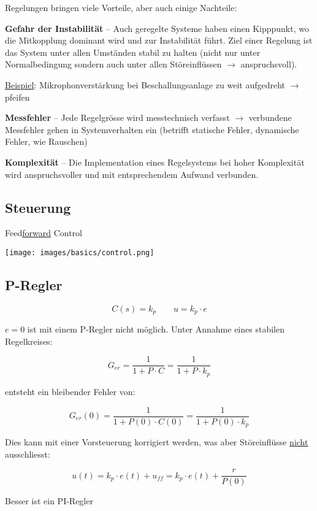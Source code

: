 \documentclass[
  10pt,
  a4paper,
  twocolumn]{article}
\numberwithin{equation}{section}
\begin{document}
Regelungen bringen viele Vorteile, aber auch einige Nachteile:

\textbf{Gefahr der Instabilität} -- Auch geregelte Systeme haben einen
Kipppunkt, wo die Mitkopplung dominant wird und zur Instabilität führt.
Ziel einer Regelung ist das System unter allen Umständen stabil zu
halten (nicht nur unter Normalbedingung sondern auch unter allen
Störeinflüssen \(\rightarrow\) anspruchsvoll).

\ul{Beispiel}: Mikrophonverstärkung bei Beschallungsanlage zu weit
aufgedreht \(\rightarrow\) pfeifen

\textbf{Messfehler} -- Jede Regelgrösse wird messtechnisch verfasst
\(\rightarrow\) verbundene Messfehler gehen in Systemverhalten ein
(betrifft statische Fehler, dynamische Fehler, wie Rauschen)

\textbf{Komplexität} -- Die Implementation eines Regelsystems bei hoher
Komplexität wird anspruchsvoller und mit entsprechendem Aufwand
verbunden.

\subsection{Steuerung}\label{steuerung}

Feed\ul{forward} Control

\texttt{[image: images/basics/control.png]}

\subsection{P-Regler}\label{p-regler}

\[
C(s) = k_p \qquad u = k_p\cdot e
\]

\begin{tcolorbox}[enhanced jigsaw, coltitle=black, colback=white, breakable, colframe=quarto-callout-warning-color-frame, rightrule=.15mm, left=2mm, opacityback=0, leftrule=.75mm, toptitle=1mm, colbacktitle=quarto-callout-warning-color!10!white, bottomtitle=1mm, arc=.35mm, bottomrule=.15mm, title=\textcolor{quarto-callout-warning-color}{\faExclamationTriangle}\hspace{0.5em}{Achtung}, titlerule=0mm, toprule=.15mm, opacitybacktitle=0.6]

\(e=0\) ist mit einem P-Regler nicht möglich. Unter Annahme eines
stabilen Regelkreises:

\[
G_{er}=\frac{1}{1+P\cdot C}=\frac{1}{1+P\cdot k_p}
\]

entsteht ein bleibender Fehler von:

\[
G_{er}(0)=\frac{1}{1+P(0)\cdot C(0)}=\frac{1}{1+P(0)\cdot k_p}
\]

Dies kann mit einer Vorsteuerung korrigiert werden, was aber
Störeinflüsse \ul{nicht} ausschliesst:

\[
u(t) = k_p\cdot e(t) + u_{ff} = k_p\cdot e(t)+\frac{r}{P(0)}
\]

Besser ist ein PI-Regler

\end{tcolorbox}
\end{document}
